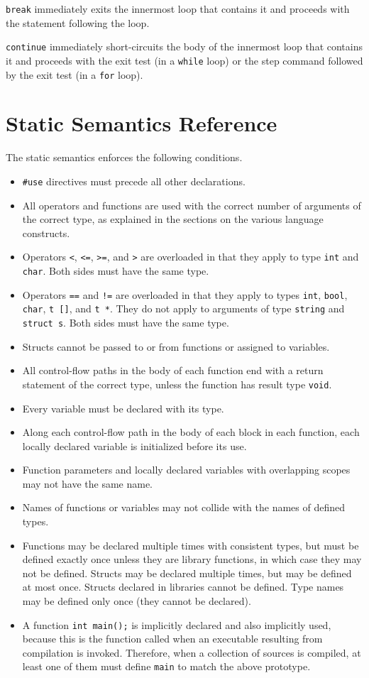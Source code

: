 \documentclass[11pt]{article}
\begin{document}
\verb'break' immediately exits the innermost loop that contains
it and proceeds with the statement following the loop.

\verb'continue' immediately short-circuits the body of the
innermost loop that contains it and proceeds with the exit test (in a
\verb'while' loop) or the step command followed by the exit test
(in a \verb'for' loop).

\section{Static Semantics Reference}

The static semantics enforces the following conditions.

\begin{itemize}
\item \verb'#use' directives must precede all other
  declarations.
\item All operators and functions are used with the
  correct number of arguments of the correct type,
  as explained in the sections on the various language
  constructs.
\item Operators \verb'<', \verb'<=', \verb'>=', and
  \verb'>' are overloaded in that they apply to
  type \verb'int' and \verb'char'.  Both sides must
  have the same type.
\item Operators \verb'==' and \verb'!=' are overloaded
  in that they apply to types \verb'int', \verb'bool',
  \verb'char', \verb't []', and \verb't *'.  They do
  not apply to arguments of type \verb'string' and
  \verb'struct s'.  Both sides must have the same type.
\item Structs cannot be passed to or from functions
  or assigned to variables.
\item All control-flow paths in the body of each function
  end with a return statement of the correct type,
  unless the function has result type \verb'void'.
\item Every variable must be declared with its type.
\item Along each control-flow path in the body of each
  block in each function, each locally declared variable
  is initialized before its use.
\item Function parameters and locally declared variables
  with overlapping scopes may not have the same name.
\item Names of functions or variables may not collide with the names
  of defined types.
\item Functions may be declared multiple times with consistent
  types, but must be defined exactly once unless they are library
  functions, in which case they may not be defined.  Structs may
  be declared multiple times, but may be defined at most once.
  Structs declared in libraries cannot be defined.  Type names may
  be defined only once (they cannot be declared).
\item A function \verb'int main();' is implicitly declared and
  also implicitly used, because this is the function called
  when an executable resulting from compilation is invoked.
  Therefore, when a collection of sources is compiled, at
  least one of them must define \verb'main' to match the
  above prototype.


\end{itemize}
\end{document}
